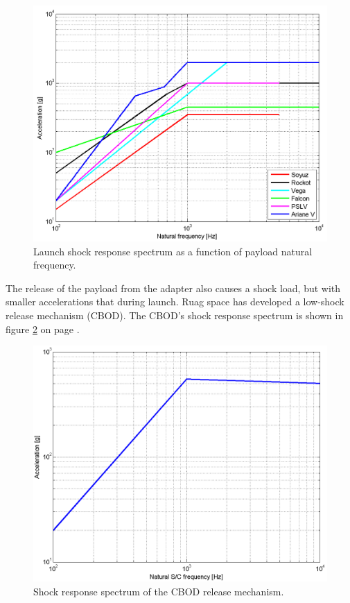 \begin{figure}[ht!]
\centering
\includegraphics[width=1.0\textwidth, angle=0]{chapters/img/Shock_Loads_Acceleration.png}
\caption{Launch shock response spectrum as a function of payload natural frequency.}
\label{fig:SRS}
\end{figure}

The release of the payload from the adapter also causes a shock load, but with smaller accelerations that during launch. Ruag space has developed a low-shock release mechanism (\ac{CBOD}). The \acs{CBOD}'s shock response spectrum is shown in figure \ref{fig:CBOD_SRS} on page \pageref{fig:CBOD_SRS}.

\begin{figure}[ht!]
\centering
\includegraphics[width=1.0\textwidth, angle=0]{chapters/img/CBOD_release_acceleration.png}
\caption{Shock response spectrum of the \acs{CBOD} release mechanism.}
\label{fig:CBOD_SRS}
\end{figure}

